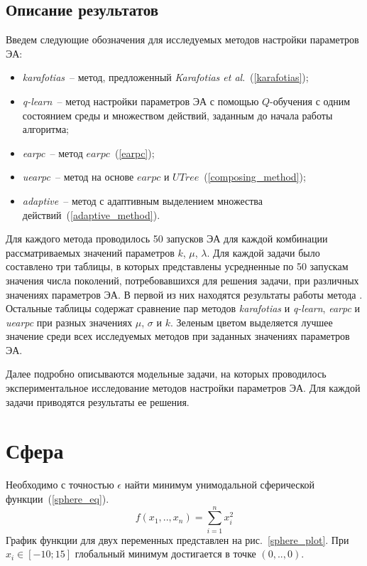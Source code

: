 \subsection{Описание результатов}

Введем следующие обозначения для исследуемых методов настройки параметров ЭА:
\begin{itemize}
 \item \textit{karafotias}~-- метод, предложенный \textit{Karafotias et al}.~(\ref{karafotias});
 \item \textit{q-learn}~-- метод настройки параметров ЭА с помощью $Q$-обучения с одним состоянием среды и множеством действий, заданным до начала работы алгоритма;
 \item \textit{earpc}~-- метод $earpc$~(\ref{earpc});
 \item \textit{uearpc}~-- метод на основе $earpc$ и $UTree$~(\ref{composing_method});
 \item \textit{adaptive}~-- метод с адаптивным выделением множества действий~(\ref{adaptive_method}).
\end{itemize}

Для каждого метода проводилось 50 запусков ЭА для каждой комбинации рассматриваемых значений параметров $k$, $\mu$, $\lambda$. Для каждой задачи было составлено три таблицы, в которых представлены усредненные по 50 запускам значения числа поколений, потребовавшихся для решения задачи, при различных значениях параметров ЭА. В первой из них находятся результаты работы метода . Остальные таблицы содержат сравнение пар методов \textit{karafotias} и \textit{q-learn}, \textit{earpc} и \textit{uearpc} при разных значениях $\mu$, $\sigma$ и $k$. Зеленым цветом выделяется лучшее значение среди всех исследуемых методов при заданных значениях параметров ЭА.
 
Далее подробно описываются модельные задачи, на которых проводилось экспериментальное исследование методов настройки параметров ЭА. Для каждой задачи приводятся результаты ее решения.
 
\section{Сфера}
\label{sphere_section}
Необходимо с точностью $\epsilon$ найти минимум унимодальной сферической функции~(\ref{sphere_eq}).
\begin{equation}
\label{sphere_eq}
f(x_1,..,x_n) = \sum\limits_{i=1}^n{x_i^2}
\end{equation}
График функции для двух переменных представлен на рис.~\ref{sphere_plot}. При $x_i \in [-10; 15]$ глобальный минимум достигается в точке $(0,..,0)$.

